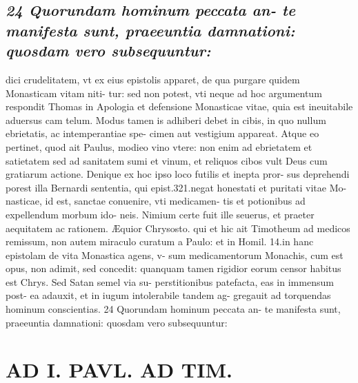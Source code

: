 \documentclass{article}
\begin{document}
\begin{pages}
\subsection*{\textit{24 Quorundam hominum peccata an- te manifesta sunt, praeeuntia damnationi: quosdam vero subsequuntur:}}dici crudelitatem, vt ex eius epistolis apparet, de qua purgare quidem Monasticam vitam niti- tur: sed non potest, vti neque ad hoc argumentum respondit Thomas in Apologia et defensione Monasticae vitae, quia est ineuitabile aduersus cam telum. Modus tamen is adhiberi debet in cibis, in quo nullum ebrietatis, ac intemperantiae spe- cimen aut vestigium appareat. Atque eo pertinet, quod ait Paulus, modieo vino vtere: non enim ad ebrietatem et satietatem sed ad sanitatem sumi et vinum, et reliquos cibos vult Deus cum gratiarum actione. Denique ex hoc ipso loco futilis et inepta pror- sus deprehendi porest illa Bernardi sententia, qui epist.321.negat honestati et puritati vitae Mo- nasticae, id est, sanctae conuenire, vti medicamen- tis et potionibus ad expellendum morbum ido- neis. Nimium certe fuit ille seuerus, et praeter aequitatem ac rationem. Æquior Chrysosto. qui et hic ait Timotheum ad medicos remissum, non autem miraculo curatum a Paulo: et in Homil. 14.in hanc epistolam de vita Monastica agens, v- sum medicamentorum Monachis, cum est opus, non adimit, sed concedit: quanquam tamen rigidior eorum censor habitus est Chrys. Sed Satan semel via su- perstitionibus patefacta, eas in immensum post- ea adauxit, et in iugum intolerabile tandem ag- gregauit ad torquendas hominum conscientias. 24 Quorundam hominum peccata an- te manifesta sunt, praeeuntia damnationi: quosdam vero subsequuntur:  \pend
\section*{AD I. PAVL. AD TIM. }
\marginpar{[ p.904 ]}\pstart {}
{}

\end{pages}
\end{document}
